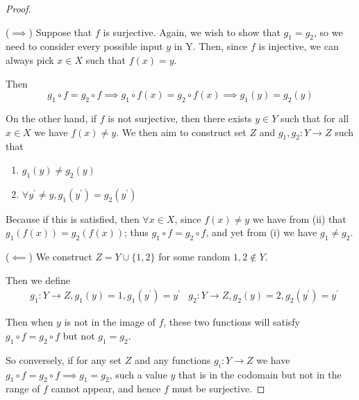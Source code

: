 \begin{proof} \

($\implies$) Suppose that $f$ is surjective. Again, we wish to show that $g_1=g_2$, so we need to consider every possible input $y$ in Y. Then, since $f$ is injective, we can always pick $x \in X$ such that $f(x)=y$.

Then
\[ g_1 \circ f=g_2 \circ f \implies g_1 \circ f(x)=g_2 \circ f(x) \implies g_1(y)=g_2(y) \]

On the other hand, if $f$ is not surjective, then there exists $y \in Y$ such that for all $x \in X$ we have $f(x)\neq y$. We then aim to construct set $Z$ and $g_1,g_2:Y\to Z$ such that
\begin{enumerate}[label=(\roman*)]
\item $g_1(y) \neq g_2(y)$
\item $\forall y^\prime \neq y, g_1(y^\prime)=g_2(y^\prime)$
\end{enumerate}

Because if this is satisfied, then $\forall x \in X$, since $f(x)\neq y$ we have from (ii) that $g_1(f(x))=g_2(f(x))$; thus $g_1 \circ f=g_2 \circ f$, and yet from (i) we have $g_1 \neq g_2$.

($\impliedby$) We construct $Z=Y\cup\{1,2\}$ for some random $1,2 \notin Y$.

Then we define
\begin{align*}
&g_1:Y\to Z,g_1(y)=1,g_1(y^\prime)=y^\prime
&g_2:Y\to Z,g_2(y)=2,g_2(y^\prime)=y^\prime
\end{align*}

Then when $y$ is not in the image of $f$, these two functions will satisfy $g_1 \circ f=g_2 \circ f$ but not $g_1=g_2$.

So conversely, if for any set $Z$ and any functions $g_i:Y \to Z$ we have $g_1 \circ f=g_2 \circ f \implies g_1=g_2$, such a value $y$ that is in the codomain but not in the range of $f$ cannot appear, and hence $f$ must be surjective.
\end{proof}

